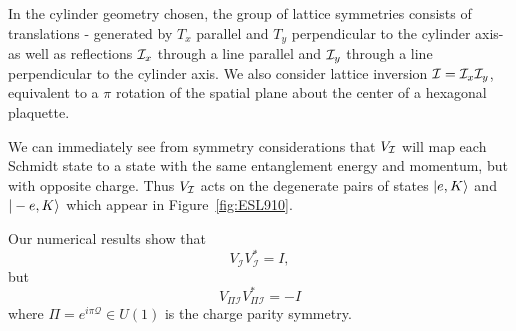In the cylinder geometry chosen, the group of lattice symmetries consists of translations 
- generated by $T_x$ parallel and $T_y$ perpendicular to the cylinder axis-
as well as reflections $\mathcal{I}_x$ through a line parallel 
and $\mathcal{I}_y$ through a line perpendicular to the cylinder axis. 
We also consider lattice inversion $\mathcal{I} = \mathcal{I}_x \mathcal{I}_y$, equivalent to a $\pi$ 
rotation of the spatial plane about the center of a hexagonal plaquette.

We can immediately see from symmetry considerations that $V_{\mathcal{I}}$ will map each Schmidt 
state to a state with the same entanglement energy and momentum, but with opposite charge.
Thus $V_{\mathcal{I}}$ acts on the degenerate pairs of states $\vert e, K \rangle$ and $\vert -e, K \rangle$ which
appear in Figure~\ref{fig:ESL910}. 

Our numerical results show that 
$$
V_{\mathcal{I}} V_{\mathcal{I}}^* = I, 
$$
but
$$
V_{\varPi \mathcal{I}} V_{\varPi \mathcal{I}}^* = -I 
$$
where $\varPi = e^{i \pi \mathcal{Q}} \in U(1)$ is the charge parity symmetry.





